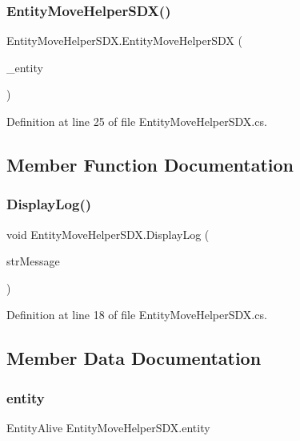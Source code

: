 \subsubsection{\texorpdfstring{EntityMoveHelperSDX()}{EntityMoveHelperSDX()}}
{\footnotesize\ttfamily Entity\+Move\+Helper\+S\+D\+X.\+Entity\+Move\+Helper\+S\+DX (\begin{DoxyParamCaption}\item[{Entity\+Alive}]{\+\_\+entity }\end{DoxyParamCaption})}



Definition at line 25 of file Entity\+Move\+Helper\+S\+D\+X.\+cs.



\subsection{Member Function Documentation}
\mbox{\label{class_entity_move_helper_s_d_x_a20b0833864e405fc378bef2a7b08e42d}} 
\subsubsection{\texorpdfstring{DisplayLog()}{DisplayLog()}}
{\footnotesize\ttfamily void Entity\+Move\+Helper\+S\+D\+X.\+Display\+Log (\begin{DoxyParamCaption}\item[{String}]{str\+Message }\end{DoxyParamCaption})}



Definition at line 18 of file Entity\+Move\+Helper\+S\+D\+X.\+cs.



\subsection{Member Data Documentation}
\mbox{\label{class_entity_move_helper_s_d_x_a21c1914c566ca9a9ef40aca19ecddac0}} 
\subsubsection{\texorpdfstring{entity}{entity}}
{\footnotesize\ttfamily Entity\+Alive Entity\+Move\+Helper\+S\+D\+X.\+entity}



